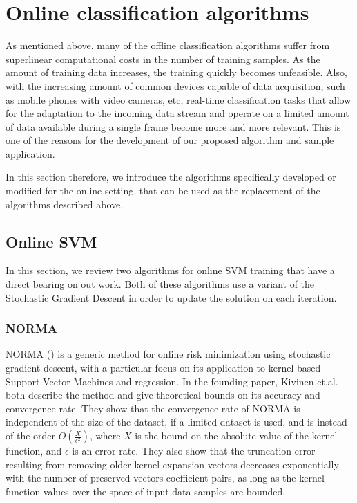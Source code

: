 \section{Online classification algorithms}

As mentioned above, many of the offline classification algorithms suffer from superlinear computational costs in the number of training samples. As the amount of training data increases, the training quickly becomes unfeasible. Also, with the increasing amount of common devices capable of data acquisition, such as mobile phones with video cameras, etc, real-time classification tasks that allow for the adaptation to the incoming data stream and operate on a limited amount of data available during a single frame become more and more relevant. This is one of the reasons for the development of our proposed algorithm and sample application.  

In this section therefore, we introduce the algorithms specifically developed or modified for the online setting, that can be used as the replacement of the algorithms described above. 
\subsection{Online SVM}
In this section, we review two algorithms for online SVM training that have a direct bearing on out work. Both of these algorithms use a variant of the Stochastic Gradient Descent in order to update the solution on each iteration. 
\subsubsection{NORMA}
\label{NORMAIntro}
NORMA (\cite{Norma}) is a generic method for online risk minimization using stochastic gradient descent, with a particular focus on its application to kernel-based Support Vector Machines and regression. In the founding paper,  Kivinen et.al. both describe the method and give theoretical  bounds on its accuracy and convergence rate. They show that the convergence rate of NORMA is independent of the size of the dataset, if a limited dataset is used, and is instead of the order $O(\frac{X}{\epsilon^2})$, where $X$ is the bound on the absolute value of the kernel function, and $\epsilon$ is an error rate. 
They also show that the truncation error resulting from removing older kernel expansion vectors decreases exponentially with the number of preserved vectors-coefficient pairs, as long as the kernel function values over the space of input data samples are bounded. 

